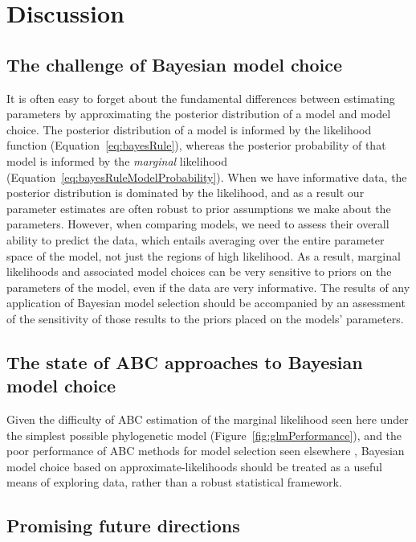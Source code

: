 \section{Discussion}

\subsection{The challenge of Bayesian model choice}

It is often easy to forget about the fundamental differences between estimating
parameters by approximating the posterior distribution of a model and model
choice.
The posterior distribution of a model is informed by the likelihood function
(Equation~\ref{eq:bayesRule}),
whereas the posterior probability of that model is informed by the
\emph{marginal} likelihood
(Equation~\ref{eq:bayesRuleModelProbability}).
When we have informative data, the posterior distribution is dominated by the
likelihood, and as a result our parameter estimates are often robust to prior
assumptions we make about the parameters.
However, when comparing models, we need to assess their overall ability to
predict the data, which entails averaging over the entire parameter space of
the model, not just the regions of high likelihood.
As a result, marginal likelihoods and associated model choices can be very
sensitive to priors on the parameters of the model, even if the data are very
informative.
The results of any application of Bayesian model selection should be
accompanied by an assessment of the sensitivity of those results to the priors
placed on the models' parameters.


\subsection{The state of ABC approaches to Bayesian model choice}

Given the difficulty of ABC estimation of the marginal likelihood seen here
under the simplest possible phylogenetic model
(Figure~\ref{fig:glmPerformance}), and the poor performance of ABC methods for
model selection seen elsewhere \citep{Robert2011,Oaks2012,Oaks2014reply},
Bayesian model choice based on approximate-likelihoods should be treated as a
useful means of exploring data, rather than a robust statistical framework.


\subsection{Promising future directions}

